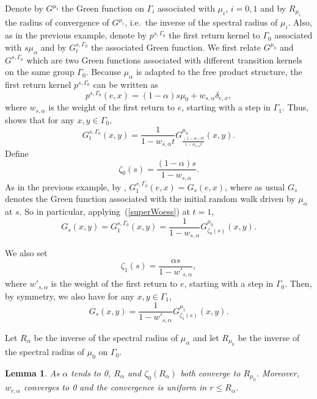 \documentclass{amsart}
\newtheorem{lem}[thm]{Lemma}
\theoremstyle{definition}
\theoremstyle{remark}
\begin{document}
Denote by $G^{\mu_i}$ the Green function on $\Gamma_i$ associated with $\mu_i$, $i=0,1$ and by $R_{\mu_i}$ the radius of convergence of $G^{\mu_i}$, i.e.\ the inverse of the spectral radius of $\mu_i$.
Also, as in the previous example, denote by $p^{s,\Gamma_0}$ the first return kernel to $\Gamma_0$ associated with $s\mu_\alpha$ and by $G_t^{s,\Gamma_0}$ the associated Green function.
We first relate $G^{\mu_0}$ and $G^{s,\Gamma_0}$ which are two Green functions associated with different transition kernels on the same group $\Gamma_0$.
Because $\mu_\alpha$ is adapted to the free product structure, the first return kernel $p^{s,\Gamma_0}$ can be written as
$$p^{s,\Gamma_0}(e,x)=(1-\alpha)s\mu_0+w_{s,\alpha}\delta_{e,x},$$
where $w_{s,\alpha}$ is the weight of the first return to $e$, starting with a step in $\Gamma_1$.
Thus, \cite[Lemma~9.2]{Woessbook} shows that for any $x,y\in \Gamma_0$,
\begin{equation}\label{superWoess}
G_t^{s,\Gamma_0}(x,y)=\frac{1}{1-w_{s,\alpha}t}G_\frac{(1-\alpha)st}{1-w_{s,\alpha}t}^{\mu_0} (x,y).
\end{equation}
Define
$$\zeta_0(s)=\frac{(1-\alpha)s}{1-w_{s,\alpha}}.$$
As in the previous example, by \cite[Lemma~4.4]{DG21}, $G_1^{s,\Gamma_0}(e,x)=G_s(e,x)$, where as usual $G_s$ denotes the Green function associated with the initial random walk driven by $\mu_\alpha$ at $s$.
So in particular, applying~(\ref{superWoess}) at $t=1$,
\begin{equation}\label{superWoess2}
G_s(x,y)=G_1^{s,\Gamma_0}(x,y)=\frac{1}{1-w_{s,\alpha}}G_{\zeta_0(s)}^{\mu_0}(x,y).
\end{equation}


We also set
$$\zeta_1(s)=\frac{\alpha s}{1-w'_{s,\alpha}},$$
where $w'_{s,\alpha}$ is the weight of the first return to $e$, starting with a step in $\Gamma_0$. 
Then, by symmetry, we also have for any $x,y\in \Gamma_1$,
\begin{equation}\label{superWoess2'}
G_s(x,y)=\frac{1}{1-w'_{s,\alpha}}G_{\zeta_1(s)}^{\mu_1}(x,y).
\end{equation}

Let $R_\alpha$ be the inverse of the spectral radius of $\mu_\alpha$ and let $R_{\mu_0}$ be the inverse of the spectral radius of $\mu_0$ on $\Gamma_0$.
\begin{lem}\label{lemalphato0}
As $\alpha$ tends to 0, $R_\alpha$ and $\zeta_0(R_\alpha)$ both converge to $R_{\mu_0}$.
Moreover, $w_{r,\alpha}$ converges to 0 and the convergence is uniform in $r\leq R_\alpha$.
\end{lem}
\end{document}
